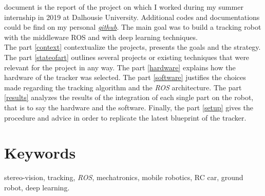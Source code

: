 document is the report of the project on which 
I worked during my summer internship in 2019 at Dalhousie 
University. Additional codes and documentations
could be find on my personal \href{https://github.com/klipfel}{\textit{github}}.
The main goal was to build a tracking robot
with the middleware ROS and with deep learning techniques.
\\\indent The part \vref{context} contextualize the projects, 
presents the goals and the strategy. The part \vref{stateofart}
outlines several projects or existing techniques that 
were relevant for the project in any way. The part 
\vref{hardware} explains how the hardware of the 
tracker was selected. The part \vref{software}
justifies the choices made regarding the 
tracking algorithm and the \textit{ROS} architecture.
The part \vref{results} analyzes the results of the integration
of each single part on the robot, that is to say the hardware and 
the software. Finally, the part \vref{setup} gives the procedure 
and advice in order to replicate the latest blueprint
of the tracker.

\section*{Keywords} stereo-vision, tracking, \textit{ROS},
mechatronics, mobile robotics, RC car, ground robot, deep learning.



